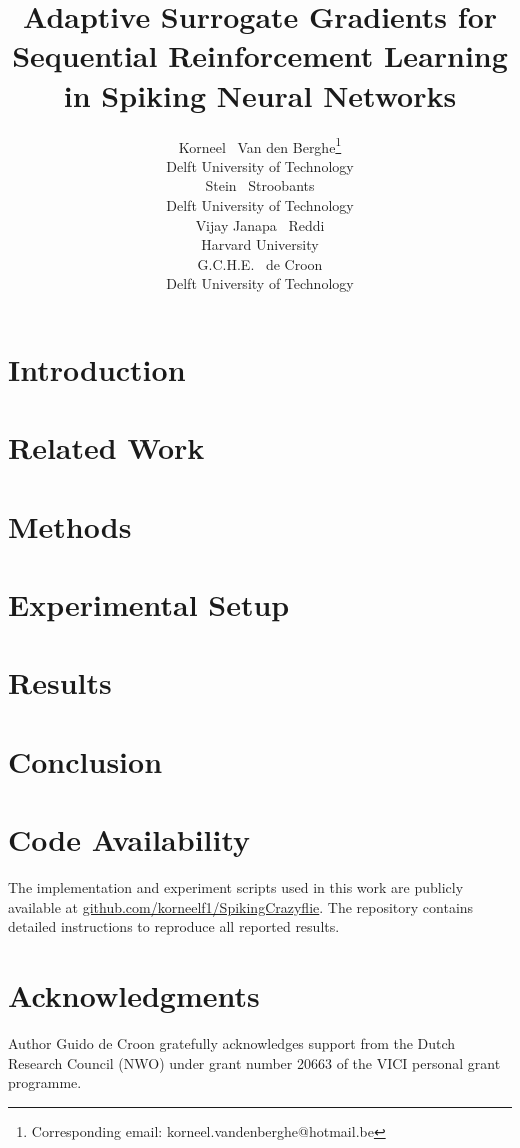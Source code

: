 \documentclass{article}
\title{Adaptive Surrogate Gradients for Sequential Reinforcement Learning in Spiking Neural Networks}
\author{%
  Korneel ~Van den Berghe\thanks{Corresponding email: korneel.vandenberghe@hotmail.be} \\
  Delft University of Technology\\
  \And
  Stein ~Stroobants \\
  Delft University of Technology \\
  \AND
  Vijay Janapa ~Reddi \\
  Harvard University \\
  \And
  G.C.H.E. ~de Croon \\
  Delft University of Technology \\
}
\begin{document}
\maketitle


\begin{abstract}

\end{abstract}

\section{Introduction}


\section{Related Work}


\section{Methods}


\section{Experimental Setup}


\section{Results}


\section{Conclusion}

\section*{Code Availability}
The implementation and experiment scripts used in this work are publicly available at 
\href{https://github.com/korneelf1/SpikingCrazyflie}{github.com/korneelf1/SpikingCrazyflie}. 
The repository contains detailed instructions to reproduce all reported results.

\section{Acknowledgments}
Author Guido de Croon gratefully acknowledges support from the Dutch Research Council (NWO) under grant number 20663 of the VICI personal grant programme.
\end{document}
